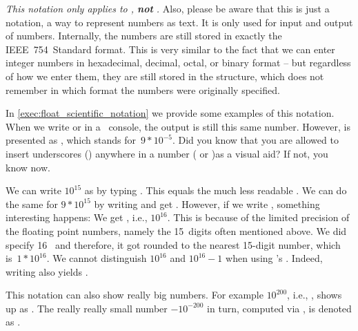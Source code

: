 \emph{This notation only applies to , \textbf{not} .}
Also, please be aware that this is just a notation, a way to represent numbers as text.
It is only used for input and output of numbers.
Internally, the numbers are still stored in exactly the IEEE~754~Standard format.
This is very similar to the fact that we can enter integer numbers in hexadecimal, decimal, octal, or binary format -- but regardless of how we enter them, they are still stored in the   structure, which does not remember in which format the numbers were originally specified.

In \cref{exec:float_scientific_notation} we provide some examples of this notation.
When we write  or  in a \python\ console, the output is still this same number.
However,  is presented as , which stands for~$9*10^{-5}$.%
%
Did you know that you are allowed to insert underscores (\pythonil{_}\pythonIdx{\_}) anywhere in a number ( or )as a visual aid?
If not, you know now.
%
%
\begin{sloppypar}%
We can write $10^{15}$ as  by typing .
This equals the much less readable .
We can do the same for $9*10^{15}$ by writing  and get .
However, if we write , something interesting happens:
We get , i.e., $10^{16}$.
This is because of the limited precision of the floating point numbers, namely the 15~digits often mentioned above.
We did specify 16~ and therefore, it got rounded to the nearest 15\nobreakdashes-digit number, which is~$1*10^{16}$.
We cannot distinguish $10^{16}$ and $10^{16}-1$ when using \python's .
Indeed, writing  also yields .%
\end{sloppypar}%
%
This notation can also show really big numbers.
For example $10^{200}$, i.e., , shows up as .
The really really small number $-10^{-200}$ in turn, computed via , is denoted as .

